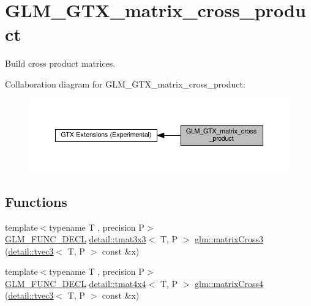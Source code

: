 \hypertarget{group__gtx__matrix__cross__product}{}\section{G\+L\+M\+\_\+\+G\+T\+X\+\_\+matrix\+\_\+cross\+\_\+product}
\label{group__gtx__matrix__cross__product}


Build cross product matrices.  


Collaboration diagram for G\+L\+M\+\_\+\+G\+T\+X\+\_\+matrix\+\_\+cross\+\_\+product\+:\nopagebreak
\begin{figure}[H]
\begin{center}
\leavevmode
\includegraphics[width=350pt]{group__gtx__matrix__cross__product}
\end{center}
\end{figure}
\subsection*{Functions}
\begin{DoxyCompactItemize}
\item 
{\footnotesize template$<$typename T , precision P$>$ }\\\hyperlink{setup_8hpp_ab2d052de21a70539923e9bcbf6e83a51}{G\+L\+M\+\_\+\+F\+U\+N\+C\+\_\+\+D\+E\+CL} \hyperlink{structglm_1_1detail_1_1tmat3x3}{detail\+::tmat3x3}$<$ T, P $>$ \hyperlink{group__gtx__matrix__cross__product_gaebbd4b4436b55c14b6d0b973167a25e4}{glm\+::matrix\+Cross3} (\hyperlink{structglm_1_1detail_1_1tvec3}{detail\+::tvec3}$<$ T, P $>$ const \&x)
\item 
{\footnotesize template$<$typename T , precision P$>$ }\\\hyperlink{setup_8hpp_ab2d052de21a70539923e9bcbf6e83a51}{G\+L\+M\+\_\+\+F\+U\+N\+C\+\_\+\+D\+E\+CL} \hyperlink{structglm_1_1detail_1_1tmat4x4}{detail\+::tmat4x4}$<$ T, P $>$ \hyperlink{group__gtx__matrix__cross__product_gab3c272adc9c9fc1f7c26d6f353b4bb4b}{glm\+::matrix\+Cross4} (\hyperlink{structglm_1_1detail_1_1tvec3}{detail\+::tvec3}$<$ T, P $>$ const \&x)
\end{DoxyCompactItemize}


